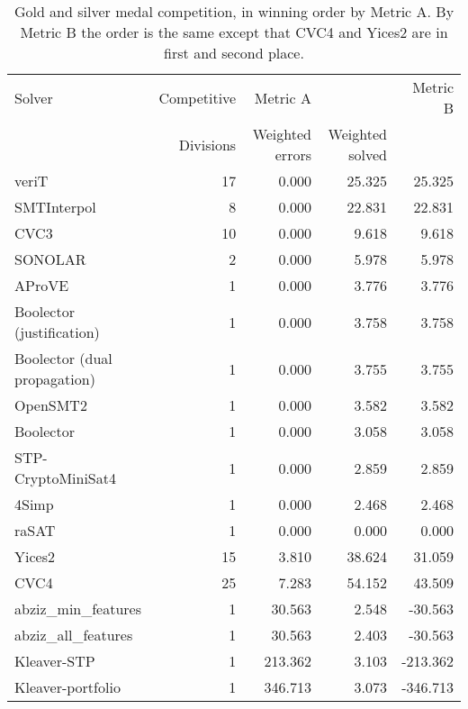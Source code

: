 \documentclass[twosize,11pt]{article}
\begin{document}
\begin{table}
\centering
\begin{tabular}{|l|r|rr|r|}
\hline
Solver  & Competitive & Metric A & & Metric B \\
 & Divisions & Weighted errors & Weighted solved & \\
\hline
veriT & 17 &	0.000 	& 	25.325 & 25.325 \\
SMTInterpol & 8 &	0.000 	& 	22.831 & 22.831 \\
CVC3 & 10	& 	0.000 	& 	9.618 & 9.618 \\
SONOLAR 	& 2	&  	0.000 	& 	5.978 & 	5.978\\
AProVE 		& 1 & 	0.000 	& 	3.776	& 	3.776\\
Boolector (justification) & 1	&  	0.000 	& 	3.758	& 	3.758\\
Boolector (dual propagation) & 1		&  	0.000 	& 	3.755 & 	3.755\\
OpenSMT2 	& 1	&  	0.000 &	3.582 &	3.582\\
Boolector & 1		&  	0.000 &	3.058  &	3.058 \\
STP-CryptoMiniSat4 	& 1	&  	0.000 &	2.859 &	2.859\\
4Simp 	& 1	& 	0.000 	& 	2.468  	& 	2.468 \\
raSAT 	& 1	& 	0.000 	& 	0.000 	& 	0.000 \\
Yices2 	& 15	&  	3.810 	& 	38.624 & 31.059 \\
CVC4 		& 25 &  	7.283 	& 	54.152 & 43.509 \\
abziz\_min\_features 	& 1	& 	30.563 	& 	2.548 & -30.563 \\
abziz\_all\_features 	& 1	&  	30.563 	& 	2.403 & -30.563 \\
Kleaver-STP 	& 1	&  	213.362 	& 	3.103 & -213.362 \\
Kleaver-portfolio & 1		&  	346.713 	& 	3.073  & -346.713 \\
\hline
\end{tabular}
\vspace{.2in}
\caption{Gold and silver medal competition, in winning order by Metric A. By Metric B the order is the same except that CVC4 and Yices2 are in first and second place.}
\label{Table:medals}
\end{table}
\end{document}
